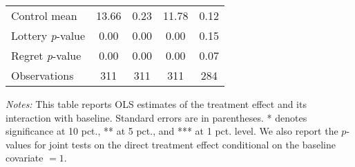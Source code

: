 \begin{table}[htbp]
{\begin{threeparttable}
\begin{tabular}{l*{4}{c}}
Control mean    &    13.66         &     0.23         &    11.78         &     0.12         \\
Lottery \emph{p}-value&     0.00         &     0.00         &     0.00         &     0.15         \\
Regret \emph{p}-value&     0.00         &     0.00         &     0.00         &     0.07         \\
Observations    &      311         &      311         &      311         &      284         \\
\bottomrule \end{tabular} \begin{tablenotes}[flushleft] \footnotesize \item \emph{Notes:} This table reports OLS estimates of the treatment effect and its interaction with baseline. Standard errors are in parentheses. * denotes significance at 10 pct., ** at 5 pct., and *** at 1 pct. level. We also report the \(p\)-values for joint tests on the direct treatment effect conditional on the baseline covariate $= 1$. \end{tablenotes} \end{threeparttable} } \end{table}

